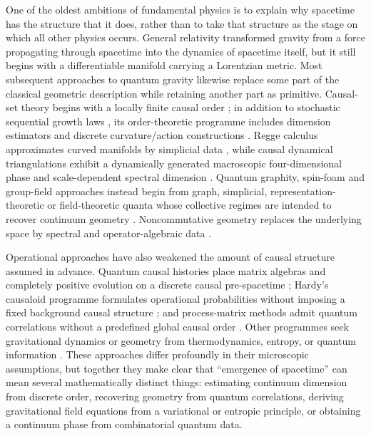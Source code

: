 \documentclass[11pt]{article}
\numberwithin{equation}{section}
\theoremstyle{definition}
\theoremstyle{remark}
\begin{document}
One of the oldest ambitions of fundamental physics is to explain why spacetime
has the structure that it does, rather than to take that structure as the stage
on which all other physics occurs.  General relativity transformed gravity
from a force propagating through spacetime into the dynamics of spacetime
itself, but it still begins with a differentiable manifold carrying a
Lorentzian metric.  Most subsequent approaches to quantum gravity likewise
replace some part of the classical geometric description while retaining
another part as primitive.  Causal-set theory begins with a locally finite
causal order \cite{bombelli-sorkin,surya}; in addition to stochastic sequential
growth laws \cite{RideoutSorkin2000}, its order-theoretic programme includes
dimension estimators \cite{Myrheim1978,Meyer1989} and discrete
curvature/action constructions \cite{BenincasaDowker2010}.  Regge calculus
approximates curved manifolds by simplicial data \cite{Regge1961}, while causal
dynamical triangulations exhibit a dynamically generated macroscopic
four-dimensional phase and scale-dependent spectral dimension
\cite{AmbjornJurkiewiczLoll2004,AmbjornJurkiewiczLoll2005,
ambjornjurkiewiczloll2009}.  Quantum graphity, spin-foam and group-field
approaches instead begin from graph, simplicial, representation-theoretic or
field-theoretic quanta whose collective regimes are intended to recover
continuum geometry
\cite{konopkamarkopouloseverini2008,Perez2013,oriti2009,
GielenOritiSindoni2013,GielenSindoni2016}.  Noncommutative geometry replaces
the underlying space by spectral and operator-algebraic data \cite{Connes1994}.

Operational approaches have also weakened the amount of causal structure
assumed in advance.  Quantum causal histories place matrix algebras and
completely positive evolution on a discrete causal pre-spacetime
\cite{HawkinsMarkopoulouSahlmann2003}; Hardy's causaloid programme formulates
operational probabilities without imposing a fixed background causal
structure \cite{Hardy2005}; and process-matrix methods admit quantum
correlations without a predefined global causal order
\cite{OreshkovCostaBrukner2012}.  Other programmes seek gravitational dynamics
or geometry from thermodynamics, entropy, or quantum information
\cite{jacobson1995,verlinde2011,vanraamsdonk2010,
LashkariMcDermottVanRaamsdonk2014,Jacobson2016,
CaoCarrollMichalakis2017}.  These approaches differ profoundly in their
microscopic assumptions, but together they make clear that ``emergence of
spacetime'' can mean several mathematically distinct things: estimating
continuum dimension from discrete order, recovering geometry from quantum
correlations, deriving gravitational field equations from a variational or
entropic principle, or obtaining a continuum phase from combinatorial quantum
data.
\end{document}

